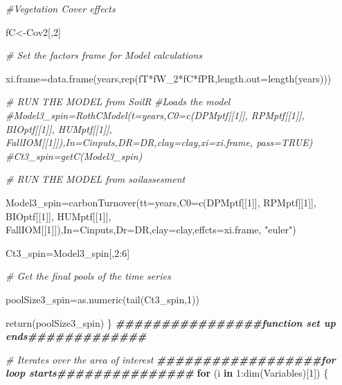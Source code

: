 \documentclass[
  10pt,
  b5paper,
]{book}
\newenvironment{Shaded}{\begin{snugshade}}{\end{snugshade}}
\newcommand{\AttributeTok}[1]{\textcolor[rgb]{0.77,0.63,0.00}{#1}}
\newcommand{\CommentTok}[1]{\textcolor[rgb]{0.56,0.35,0.01}{\textit{#1}}}
\newcommand{\ControlFlowTok}[1]{\textcolor[rgb]{0.13,0.29,0.53}{\textbf{#1}}}
\newcommand{\DecValTok}[1]{\textcolor[rgb]{0.00,0.00,0.81}{#1}}
\newcommand{\DocumentationTok}[1]{\textcolor[rgb]{0.56,0.35,0.01}{\textbf{\textit{#1}}}}
\newcommand{\FunctionTok}[1]{\textcolor[rgb]{0.00,0.00,0.00}{#1}}
\newcommand{\NormalTok}[1]{#1}
\newcommand{\OtherTok}[1]{\textcolor[rgb]{0.56,0.35,0.01}{#1}}
\newcommand{\SpecialCharTok}[1]{\textcolor[rgb]{0.00,0.00,0.00}{#1}}
\newcommand{\StringTok}[1]{\textcolor[rgb]{0.31,0.60,0.02}{#1}}
\begin{document}
\begin{Shaded}
\begin{Highlighting}[]
\CommentTok{\#Vegetation Cover effects  }

\NormalTok{fC}\OtherTok{\textless{}{-}}\NormalTok{Cov2[,}\DecValTok{2}\NormalTok{]}

\CommentTok{\# Set the factors frame for Model calculations}

\NormalTok{xi.frame}\OtherTok{=}\FunctionTok{data.frame}\NormalTok{(years,}\FunctionTok{rep}\NormalTok{(fT}\SpecialCharTok{*}\NormalTok{fW\_2}\SpecialCharTok{*}\NormalTok{fC}\SpecialCharTok{*}\NormalTok{fPR,}\AttributeTok{length.out=}\FunctionTok{length}\NormalTok{(years)))}

\CommentTok{\# RUN THE MODEL from SoilR}
\CommentTok{\#Loads the model }
\CommentTok{\#Model3\_spin=RothCModel(t=years,C0=c(DPMptf[[1]], RPMptf[[1]], BIOptf[[1]], HUMptf[[1]], FallIOM[[1]]),In=Cinputs,DR=DR,clay=clay,xi=xi.frame, pass=TRUE) }
\CommentTok{\#Ct3\_spin=getC(Model3\_spin)}

\CommentTok{\# RUN THE MODEL from soilassesment}

\NormalTok{Model3\_spin}\OtherTok{=}\FunctionTok{carbonTurnover}\NormalTok{(}\AttributeTok{tt=}\NormalTok{years,}\AttributeTok{C0=}\FunctionTok{c}\NormalTok{(DPMptf[[}\DecValTok{1}\NormalTok{]], RPMptf[[}\DecValTok{1}\NormalTok{]], BIOptf[[}\DecValTok{1}\NormalTok{]], HUMptf[[}\DecValTok{1}\NormalTok{]], FallIOM[[}\DecValTok{1}\NormalTok{]]),}\AttributeTok{In=}\NormalTok{Cinputs,}\AttributeTok{Dr=}\NormalTok{DR,}\AttributeTok{clay=}\NormalTok{clay,}\AttributeTok{effcts=}\NormalTok{xi.frame, }\StringTok{"euler"}\NormalTok{) }

\NormalTok{Ct3\_spin}\OtherTok{=}\NormalTok{Model3\_spin[,}\DecValTok{2}\SpecialCharTok{:}\DecValTok{6}\NormalTok{]}

\CommentTok{\# Get the final pools of the time series}

\NormalTok{poolSize3\_spin}\OtherTok{=}\FunctionTok{as.numeric}\NormalTok{(}\FunctionTok{tail}\NormalTok{(Ct3\_spin,}\DecValTok{1}\NormalTok{))}

\FunctionTok{return}\NormalTok{(poolSize3\_spin)}
\NormalTok{\}}
\DocumentationTok{\#\#\#\#\#\#\#\#\#\#\#\#\#\#\#\#function set up ends\#\#\#\#\#\#\#\#\#\#\#\#\#}


\CommentTok{\# Iterates over the area of interest}
\DocumentationTok{\#\#\#\#\#\#\#\#\#\#\#\#\#\#\#\#\#\#for loop starts\#\#\#\#\#\#\#\#\#\#\#\#\#\#\#}
\ControlFlowTok{for}\NormalTok{ (i }\ControlFlowTok{in} \DecValTok{1}\SpecialCharTok{:}\FunctionTok{dim}\NormalTok{(Variables)[}\DecValTok{1}\NormalTok{]) \{}


\end{Highlighting}
\end{Shaded}
\end{document}

